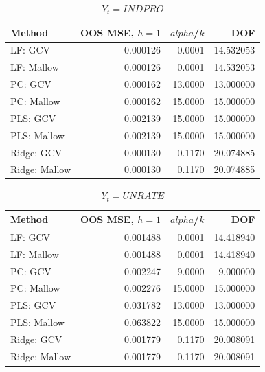 \begin{table}[h!]
\centering
\caption{$Y_t = INDPRO$}
\label{tab::indpro}
	\begin{tabular}{lrrr}
\toprule
       Method &  OOS MSE, $h =1$ &  $alpha$/$k$ &  DOF \\
\midrule
      LF: GCV & 0.000126 &   0.0001 & 14.532053 \\
   LF: Mallow & 0.000126 &   0.0001 & 14.532053 \\
      PC: GCV & 0.000162 &  13.0000 & 13.000000 \\
   PC: Mallow & 0.000162 &  15.0000 & 15.000000 \\
     PLS: GCV & 0.002139 &  15.0000 & 15.000000 \\
  PLS: Mallow & 0.002139 &  15.0000 & 15.000000 \\
   Ridge: GCV & 0.000130 &   0.1170 & 20.074885 \\
Ridge: Mallow & 0.000130 &   0.1170 & 20.074885 \\
\bottomrule
\end{tabular}
\end{table}

\begin{table}[h!]
\centering
\caption{$Y_t = UNRATE$}
\label{tab::unrate}
\begin{tabular}{lrrr}
\toprule
       Method &  OOS MSE, $h =1$ &  $alpha$/$k$ &  DOF \\
\midrule
      LF: GCV & 0.001488 &   0.0001 & 14.418940 \\
   LF: Mallow & 0.001488 &   0.0001 & 14.418940 \\
      PC: GCV & 0.002247 &   9.0000 &  9.000000 \\
   PC: Mallow & 0.002276 &  15.0000 & 15.000000 \\
     PLS: GCV & 0.031782 &  13.0000 & 13.000000 \\
  PLS: Mallow & 0.063822 &  15.0000 & 15.000000 \\
   Ridge: GCV & 0.001779 &   0.1170 & 20.008091 \\
Ridge: Mallow & 0.001779 &   0.1170 & 20.008091 \\
\bottomrule
\end{tabular}
\end{table}

